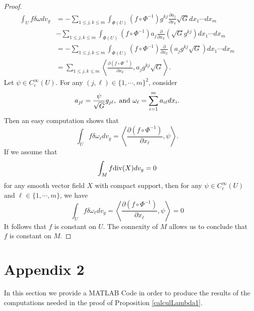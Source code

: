\documentclass[12pt,english]{smfart} %
\theoremstyle{remark}
\begin{document}
\begin{proof}
\begin{align*}
\int_Uf\delta\omega dv_g&=-\sum_{1\leqslant j,k\leqslant m}\int_{\Phi(U)}(f\circ\Phi^{-1})g^{kj}\frac{\partial a_j}{\partial x_k}\sqrt{G}dx_1\cdots dx_m\\
&-\sum_{1\leqslant j,k\leqslant m}\int_{\Phi(U)}(f\circ\Phi^{-1})a_j\frac{\partial}{\partial x_k}(\sqrt{G}g^{kj})dx_1\cdots dx_m\\
&=-\sum_{1\leqslant j,k\leqslant m}\int_{\Phi(U)}(f\circ\Phi^{-1})\frac{\partial}{\partial x_k}(a_jg^{kj}\sqrt{G})dx_1\cdots dx_m\\
&=\sum_{1\leqslant j,k\leqslant m}\left\langle\frac{\partial(f\circ\Phi^{-1})}{\partial x_k},a_jg^{kj}\sqrt{G}\right\rangle.
\end{align*}
Let $\psi\in C^{\infty}_c(U)$. For any $(j,\ell)\in\{1,\cdots,m\}^2$, consider $$a_{j\ell}=\dfrac{\psi}{\sqrt{G}}g_{j\ell}, \textnormal{ and }\omega_{\ell}=\displaystyle\sum_{i=1}^ma_{i\ell}dx_i.$$ Then an easy computation shows that 
$$\int_Uf\delta\omega_{\ell} dv_g=\left\langle\frac{\partial(f\circ\Phi^{-1})}{\partial x_{\ell}},\psi\right\rangle.$$
If we assume that $$\displaystyle\int_M f{\rm div}(X)dv_g=0$$ for any smooth vector field $X$ with compact support, then for any $\psi\in C_c^{\infty}(U)$ and $\ell\in\{1,\cdots,m\}$, we have
$$\int_Uf\delta\omega_{\ell} dv_g=\left\langle\frac{\partial(f\circ\Phi^{-1})}{\partial x_{\ell}},\psi\right\rangle=0$$
It follows that $f$ is constant on $U$. The connexity of $M$ allows us to conclude that $f$ is constant on $M$.
\end{proof}
  
 \section{Appendix 2}   
 In this section we provide a MATLAB Code in order to produce the results of the computations needed in the proof of Proposition \ref{calculLambda1}.
 
\end{document}
